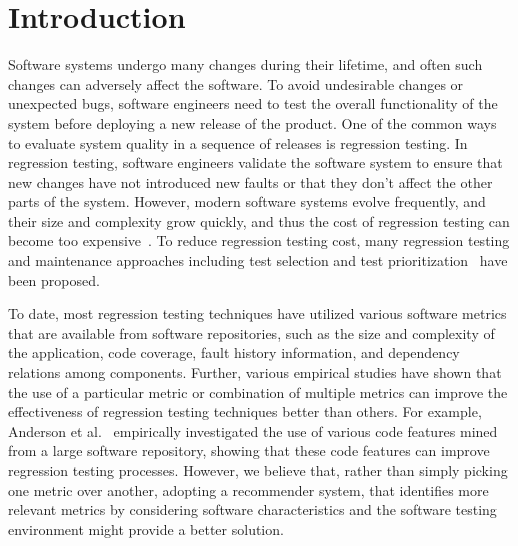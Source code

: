 \section{Introduction}
\label{sec:introduction}

Software systems undergo many changes during their lifetime, and often
such changes can adversely affect the software. 
To avoid undesirable changes or unexpected bugs, software engineers need to  
test the overall functionality of the system before deploying a new release 
of the product. One of the common ways to evaluate system quality 
in a sequence of releases is regression testing.
In regression testing, software engineers validate the software system
to ensure that new changes have not introduced new faults or that they don't 
affect the other parts of the system. However, modern software systems 
evolve frequently, and their size and complexity grow quickly, and thus  
the cost of regression testing can become too expensive~\cite{jeff16}. 
To reduce regression testing cost, many regression testing and maintenance
approaches including test selection and test prioritization~\cite{marksurvey} have been proposed.

To date, most regression testing techniques have utilized various 
software metrics that are available from software repositories, such as
the size and complexity of the application, code coverage, fault history information, 
and dependency relations among components. 
Further, various empirical studies have shown that the use of a particular metric or 
 combination of multiple metrics can improve the effectiveness of
regression testing techniques better than others. For example, Anderson et 
al.~\cite{jeff14} empirically investigated the use of various code features
mined from a large software repository, showing that these code features
can improve regression testing processes.
However, we believe that, rather than simply picking one metric over another, 
adopting a recommender system, that identifies more relevant metrics by considering 
software characteristics and the software testing environment might provide a better solution.

